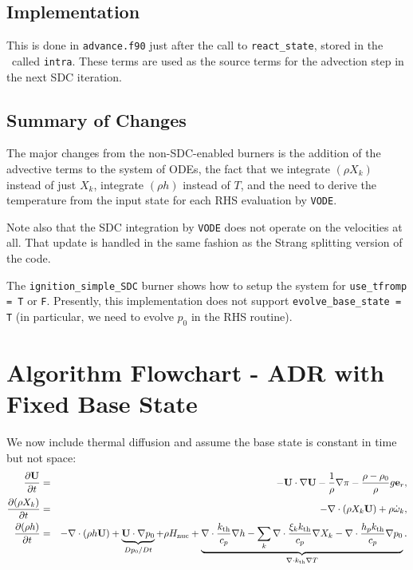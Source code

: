 \subsection{Implementation}

This is done in {\tt advance.f90} just after the call to {\tt react\_state},
stored in the \multifab\ called {\tt intra}.
These terms are used as the source terms for the
advection step in the next SDC iteration.

\subsection{Summary of Changes}
The major changes from the non-SDC-enabled burners is the addition of
the advective terms to the system of ODEs, the fact that we integrate
$(\rho X_k)$ instead of just $X_k$, integrate $(\rho h)$ instead
of $T$, and the need to derive the
temperature from the input state for each RHS evaluation by {\tt VODE}.

Note also that the SDC integration by {\tt VODE} does not operate on 
the velocities at all.  That update is handled in the same fashion 
as the Strang splitting version of the code.

The {\tt ignition\_simple\_SDC} burner shows how to setup the system
for {\tt use\_tfromp = T} or {\tt F}.  Presently, this implementation
does not support {\tt evolve\_base\_state = T} (in particular, we 
need to evolve $p_0$ in the RHS routine).

\section{Algorithm Flowchart - ADR with Fixed Base State}
We now include thermal diffusion and assume the base state is constant in time but not space:
\begin{eqnarray}
\frac{\partial{\bf U}}{\partial t} &=& 
    -{\bf U}\cdot\nabla{\bf U}  - \frac{1}{\rho}\nabla\pi 
    - \frac{\rho-\rho_0}{\rho} g{\bf e}_r,\\
\frac{\partial(\rho X_k)}{\partial t} &=& 
    -\nabla\cdot(\rho X_k{\bf U}) + \rho\dot{\omega}_k,\label{eq:sdc species}\\
\frac{\partial(\rho h)}{\partial t} &=&
    -\nabla\cdot(\rho h{\bf U}) + \underbrace{{\bf U}\cdot\nabla p_0}_{Dp_0/Dt}
    + \rho{H_{\rm nuc}}
    + \underbrace{\nabla\cdot\frac{k_{\rm th}}{c_p}\nabla h - \sum_k\nabla\cdot\frac{\xi_k k_{\rm th}}{c_p}\nabla X_k - \nabla\cdot\frac{h_p k_{\rm th}}{c_p}\nabla p_0}_{\nabla\cdot k_{\rm th}\nabla T}.\nonumber\\
\label{eq:sdc enthalpy}
\end{eqnarray}

